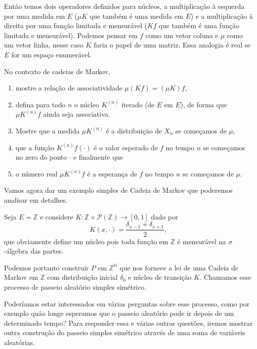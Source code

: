 Então temos dois operadores definidos para núcleos, a multiplicação à esquerda por uma medida em $E$ ($\mu K$ que também é uma medida em $E$) e a multiplicação à direita por uma função limitada e mensurável ($K f$ que também é uma função limitada e mensurável).
Podemos pensar em $f$ como um vetor coluna e $\mu$ como um vetor linha, nesse caso $K$ faria o papel de uma matriz.
Essa analogia é real se $E$ for um espaço enumerável.

\begin{exercise}
  No contexto de cadeias de Markov,
  \begin{enumerate}[\quad a)]
  \item mostre a relação de associatividade $\mu (K f) = (\mu K) f$,
  \item defina para todo $n$ o núcleo $K^{(n)}$ iterado (de $E$ em $E$), de forma que $\mu K^{(n)} f$ ainda seja associativa.
  \item Mostre que a medida $\mu K^{(n)}$ é a distribuição de $X_n$ se começamos de $\mu$,
  \item que a função $K^{(n)} f (\cdot)$ é o valor esperado de $f$ no tempo $n$ se começamos no zero do ponto $\cdot$ e finalmente que
  \item o número real $\mu K^{(n)} f$ é a esperança de $f$ no tempo $n$ se começamos de $\mu$.
  \end{enumerate}
\end{exercise}

Vamos agora dar um exemplo simples de Cadeia de Markov que poderemos analisar em detalhes.

Seja $E = \mathbb{Z}$ e considere $K: \mathbb{Z} \times \mathcal{P}(\mathbb{Z}) \to [0,1]$ dado por
\begin{equation}
  K(x, \cdot) = \frac{\delta_{x-1} + \delta_{x+1}}{2},
\end{equation}
que obviamente define um núcleo pois toda função em $\mathbb{Z}$ é mensurável na $\sigma$-álgebra das partes.

Podemos portanto construir $P$ em $\mathbb{Z}^{\mathbb{N}}$ que nos fornece a lei de uma Cadeia de Markov em $\mathbb{Z}$ com distribuição inicial $\delta_0$ e núcleo de transição $K$.
Chamamos esse processo de passeio aleatório simples simétrico. 

Poderíamos estar interessados em várias perguntas sobre esse processo, como por exemplo quão longe esperamos que o passeio aleatório pode ir depois de um determinado tempo?
Para responder essa e várias outras questões, iremos mostrar outra construção do passeio simples simétrico através de uma soma de variáveis aleatórias.


